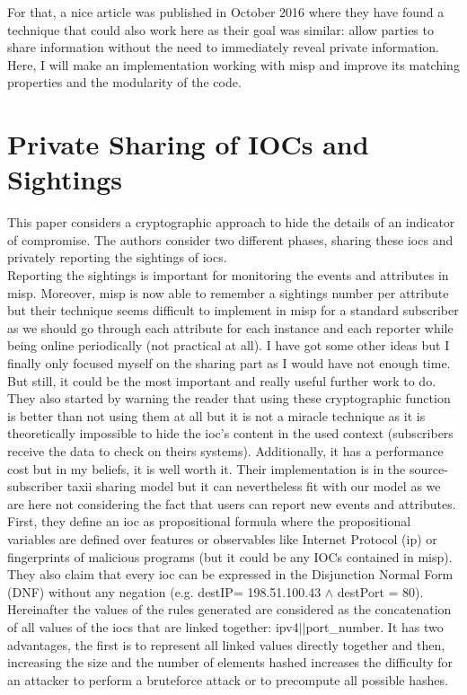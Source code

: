 \documentclass{eplmastersthesis}
\begin{document}
For that, a nice article \cite{van2016private} was published in October 2016 where they have found a technique that could also work here as their goal was similar: allow parties to share information without the need to immediately reveal private information.
Here, I will make an implementation working with \gls{misp} and improve its matching properties and the modularity of the code. 

\section{Private Sharing of IOCs and Sightings \cite{van2016private}}
\label{sec:articlePrivate}
This paper considers a cryptographic approach to hide the details of an indicator of compromise. The authors consider two different phases, sharing these \glspl{ioc} and privately reporting the sightings of \glspl{ioc}.\\

Reporting the sightings is important for monitoring the events and attributes in \gls{misp}.
Moreover, \gls{misp} is now able to remember a sightings number per attribute but their technique seems difficult to implement in \gls{misp} for a standard subscriber as we should go through each attribute for each instance and each reporter while being online periodically (not practical at all). I have got some other ideas but I finally only focused myself on the sharing part as I would have not enough time.
But still, it could be the most important and really useful further work to do.\\

They also started by warning the reader that using these cryptographic function is better than not using them at all but it is not a miracle technique as it is theoretically impossible to hide the \gls{ioc}’s content in the used context (subscribers receive the data to check on theirs systems).
Additionally, it has a performance cost but in my beliefs, it is well worth it. Their implementation is in the source-subscriber \gls{taxii} sharing model but it can nevertheless fit with our model as we are here not considering the fact that users can report new events and attributes.
First, they define an \gls{ioc} as propositional formula where the propositional variables are defined over features or observables like Internet Protocol (\gls{ip}) or fingerprints of malicious programs (but it could be any IOCs contained in \gls{misp}). They also claim that every \gls{ioc} can be expressed in the Disjunction Normal Form (DNF) without any negation (e.g. destIP= 198.51.100.43 $\land$ destPort = 80).
Hereinafter the values of the rules generated are considered as the concatenation of all values of the \glspl{ioc} that are linked together: \gls{ipv4}$||$port\_number. It has two advantages, the first is to represent all linked values directly together and then, increasing the size and the number of elements hashed increases the difficulty for an attacker to perform a bruteforce attack or to precompute all possible hashes.\\
\end{document}
